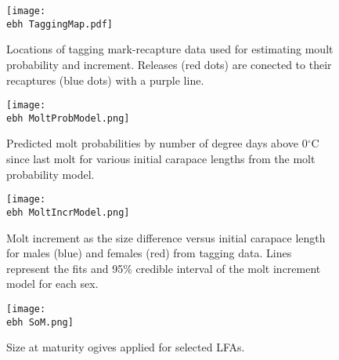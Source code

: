     \begin{figure}
    \centering
        \texttt{[image: \\ebh TaggingMap.pdf]}
        \caption{Locations of tagging mark-recapture data used for estimating moult probability and increment. Releases (red dots) are conected to their recaptures (blue dots) with a purple line.}

    \end{figure}

    \begin{figure}
    \centering
        \texttt{[image: \\ebh MoltProbModel.png]}
        \caption{Predicted molt probabilities by number of degree days above 0$^{\circ}$C since last molt for various initial carapace lengths from the molt probability model.}

    \end{figure}

    \begin{figure}
    \centering
        \texttt{[image: \\ebh MoltIncrModel.png]}
        \caption{Molt increment as the size difference versus initial carapace length for males (blue) and females (red) from tagging data. Lines represent the fits and 95\% credible interval of the molt increment model for each sex.}

    \end{figure}    


    \begin{figure}
    \centering
        \texttt{[image: \\ebh SoM.png]}
        \caption{Size at maturity ogives applied for selected LFAs.}

    \end{figure}    

  



    
